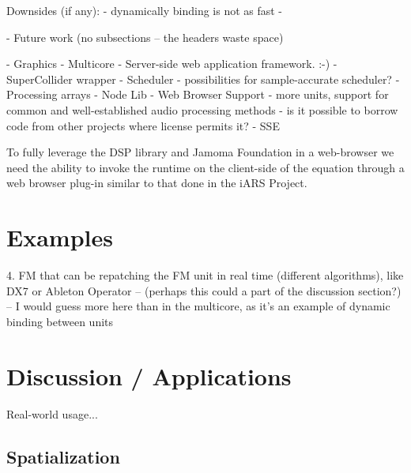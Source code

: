 \documentclass[twoside,10pt]{article}
\begin{document}
    Downsides (if any):
        -  dynamically binding is not as fast
        - 
    
- Future work (no subsections -- the headers waste space)

    - Graphics
    - Multicore
    - Server-side web application framework. :-)
    - SuperCollider wrapper
    - Scheduler - possibilities for sample-accurate scheduler?
    - Processing arrays
    - Node Lib
    - Web Browser Support
    - more units, support for common and well-established audio processing methods -  is it possible to borrow code from other projects where license permits it?
    - SSE
    
    



To fully leverage the DSP library and Jamoma Foundation in a web-browser we need the ability to invoke the runtime on the client-side of the equation through a web browser plug-in similar to that done in the iARS Project\cite{Frauenberger:2003}.



\section{Examples} %

4. FM that can be repatching the FM unit in real time (different algorithms), like DX7 or Ableton Operator  -- (perhaps this could a part of the discussion section?) -- I would guess more here than in the multicore, as it's an example of dynamic binding between units






\section{Discussion / Applications} %

Real-world usage...

\subsection{Spatialization}
\end{document}

